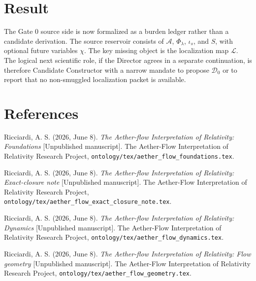 \documentclass[11pt]{article}
\newcommand{\Sub}{\mathcal{A}}
\begin{document}
\section{Result}

The Gate 0 source side is now formalized as a burden ledger rather than a
candidate derivation. The source reservoir consists of
\(\Sub\), \(\Phi_{\lambda}\), \(\iota_s\), and \(S\), with optional future
variables \(\chi\). The key missing object is the localization map
\(\mathcal{L}\). The logical next scientific role, if the Director agrees in a
separate continuation, is therefore Candidate Constructor with a narrow mandate
to propose \(\mathcal{D}_{0}\) or to report that no non-smuggled localization
packet is available.

\section*{References}

Ricciardi, A. S. (2026, June 8). \emph{The Aether-flow Interpretation of
Relativity: Foundations} [Unpublished manuscript]. The Aether-Flow
Interpretation of Relativity Research Project,
\texttt{ontology/tex/aether\_flow\_foundations.tex}.

Ricciardi, A. S. (2026, June 8). \emph{The Aether-flow Interpretation of
Relativity: Exact-closure note} [Unpublished manuscript]. The Aether-Flow
Interpretation of Relativity Research Project,
\texttt{ontology/tex/aether\_flow\_exact\_closure\_note.tex}.

Ricciardi, A. S. (2026, June 8). \emph{The Aether-flow Interpretation of
Relativity: Dynamics} [Unpublished manuscript]. The Aether-Flow Interpretation
of Relativity Research Project,
\texttt{ontology/tex/aether\_flow\_dynamics.tex}.

Ricciardi, A. S. (2026, June 8). \emph{The Aether-flow Interpretation of
Relativity: Flow geometry} [Unpublished manuscript]. The Aether-Flow
Interpretation of Relativity Research Project,
\texttt{ontology/tex/aether\_flow\_geometry.tex}.
\end{document}

